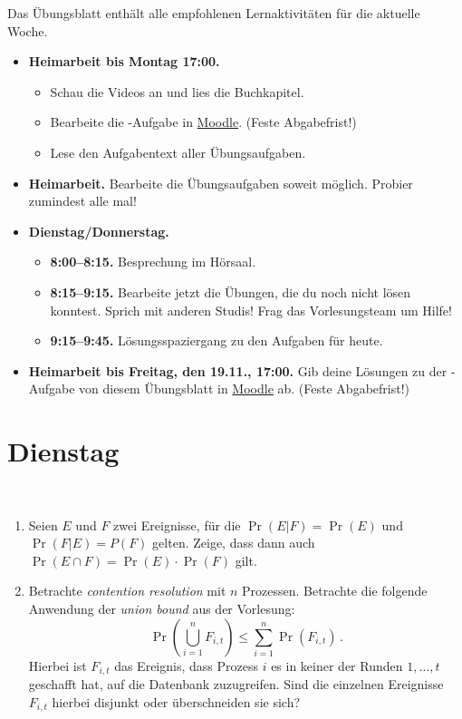 \documentclass{uebung_cs}
\begin{document}
Das Übungsblatt enthält alle empfohlenen Lernaktivitäten für die aktuelle Woche.

\begin{itemize}
\item \textbf{Heimarbeit bis Montag 17:00.}
    \begin{itemize}
    \item 
    Schau die Videos an und lies die Buchkapitel.
    \item Bearbeite die -Aufgabe in \href{https://moodle.studiumdigitale.uni-frankfurt.de/moodle/course/view.php?id=2241}{Moodle}. (Feste Abgabefrist!)
    \item Lese den Aufgabentext aller Übungsaufgaben.
    \end{itemize}
\item \textbf{Heimarbeit.} Bearbeite die Übungsaufgaben soweit möglich. Probier zumindest alle mal!
\item \textbf{Dienstag/Donnerstag.}
\begin{itemize}
    \item \textbf{8:00--8:15.} Besprechung im Hörsaal.
    \item \textbf{8:15--9:15.} Bearbeite jetzt die Übungen, die du noch nicht lösen konntest. Sprich mit anderen Studis! Frag das Vorlesungsteam um Hilfe!
    \item \textbf{9:15--9:45.} Lösungsspaziergang zu den Aufgaben für heute.
\end{itemize}

\item \textbf{Heimarbeit bis Freitag, den 19.11., 17:00.} Gib deine Lösungen zu der -Aufgabe von diesem Übungsblatt in \href{https://moodle.studiumdigitale.uni-frankfurt.de/moodle/course/view.php?id=2241}{Moodle} ab. (Feste Abgabefrist!)
\end{itemize}

\section*{Dienstag}

\begin{exercise}[Wahrscheinlichkeitsrechnung]\
	\begin{enumerate}
		\item 
		Seien $E$ und $F$ zwei Ereignisse, für die $\Pr(E | F) = \Pr(E)$ und $\Pr(F | E) = P(F)$ gelten. Zeige, dass dann auch $\Pr(E \cap F) = \Pr(E) \cdot \Pr(F)$ gilt.
		\item Betrachte \textit{contention resolution} mit $n$ Prozessen. Betrachte die folgende Anwendung der \textit{union bound} aus der Vorlesung:
		\[
			\Pr\left(\bigcup_{i=1}^n F_{i,t}\right)
			\le
			\sum_{i=1}^n \Pr(F_{i,t})\,.
		\]
		Hierbei ist $F_{i,t}$ das Ereignis, dass Prozess $i$ es in keiner der Runden $1,\dots,t$ geschafft hat, auf die Datenbank zuzugreifen.
		Sind die einzelnen Ereignisse~$F_{i,t}$ hierbei disjunkt oder überschneiden sie sich?
	\end{enumerate}
\end{exercise}
\end{document}
